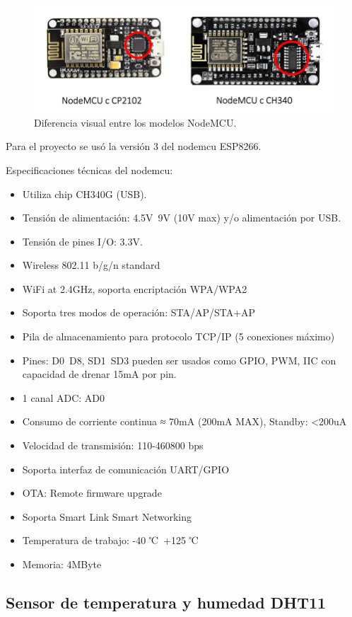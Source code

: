 \begin{figure}[htbp]
	\centering
	\includegraphics[width=.85\textwidth]{./Figures/NodeMcu.jpg}
	\caption{Diferencia visual entre los modelos NodeMCU.}

	\label{fig:nodemcu}
\end{figure}

Para el proyecto se usó la versión 3 del nodemcu ESP8266.

Especificaciones técnicas del nodemcu:

\begin{itemize}
\item Utiliza chip CH340G (USB).
\item Tensión de alimentación: 4.5V~9V (10V max) y/o alimentación por USB.
\item Tensión de pines I/O: 3.3V.
\item Wireless 802.11 b/g/n standard
\item WiFi at 2.4GHz, soporta encriptación WPA/WPA2
\item Soporta tres modos de operación: STA/AP/STA+AP
\item Pila de almacenamiento para protocolo TCP/IP (5 conexiones máximo)
\item Pines: D0~D8, SD1~SD3 pueden ser usados como GPIO, PWM, IIC con capacidad de drenar 15mA por pin.
\item 1 canal ADC: AD0
\item Consumo de corriente continua ≈ 70mA (200mA MAX), Standby: <200uA
\item Velocidad de transmisión: 110-460800 bps
\item Soporta interfaz de comunicación UART/GPIO
\item OTA: Remote firmware upgrade
\item Soporta Smart Link Smart Networking
\item Temperatura de trabajo: -40 ℃~+125 ℃
\item Memoria: 4MByte
\end{itemize}

\subsection{Sensor de temperatura y humedad DHT11}

